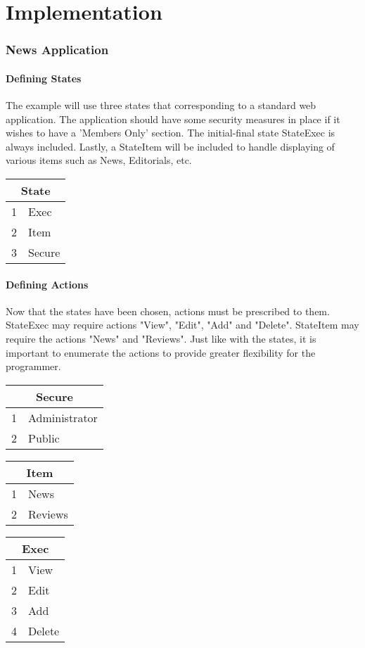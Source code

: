 \documentclass[11pt,twocolumn]{article}
\begin{document}
\newpage
\part{Implementation}

\section{News Application}
\subsection{Defining States}
The example will use three states that corresponding to a standard web application. The application should have some security measures in place if it wishes to have a 'Members Only' section. The initial-final state StateExec is always included. Lastly, a StateItem will be included to handle displaying of various items such as News, Editorials, etc.
\begin{center}
\begin{tabular}{|l|l|}
\hline
\multicolumn{2}{|c|}{State} \\
\hline
1 & Exec \\
2 & Item \\
3 & Secure \\
\hline
\end{tabular}
\end{center}

\subsection {Defining Actions}
Now that the states have been chosen, actions must be prescribed to them. StateExec may require actions "View", "Edit", "Add" and "Delete". StateItem may require the actions "News" and "Reviews". Just like with the states, it is important to enumerate the actions to provide greater flexibility for the programmer.
\begin{center}
\begin{tabular}{|l|l|}
\hline
\multicolumn{2}{|c|}{Secure} \\
\hline
1 & Administrator \\
2 & Public \\
\hline
\end{tabular}
\begin{tabular}{|l|l|}
\hline
\multicolumn{2}{|c|}{Item} \\
\hline
1 & News \\
2 & Reviews \\
\hline
\end{tabular}
\begin{tabular}{|l|l|}
\hline
\multicolumn{2}{|c|}{Exec} \\
\hline
1 & View \\
2 & Edit \\
3 & Add \\
4 & Delete \\
\hline
\end{tabular}
\end{center}
\end{document}
